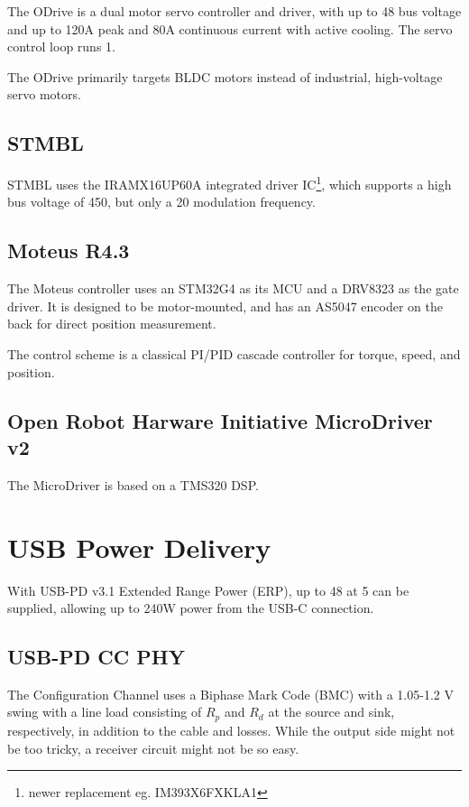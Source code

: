 \documentclass[12pt,a4paper,oneside,openany]{article}
\begin{document}
The ODrive is a dual motor servo controller and driver, with up to \unit{48}{\volt} bus voltage and up to \unit{120}{A} peak and \unit{80}{A} continuous current with active cooling. The servo control loop runs \unit{1}{\kilo\hertz}.

The ODrive primarily targets BLDC motors instead of industrial, high-voltage servo motors.

\subsection{STMBL}

STMBL uses the IRAMX16UP60A integrated driver IC\footnote{newer replacement eg. IM393X6FXKLA1}, which supports a high bus voltage of \unit{450}{\volt}, but only a \unit{20}{\kilo\hertz} modulation frequency.

\subsection{Moteus R4.3}

The Moteus controller uses an STM32G4 as its MCU and a DRV8323 as the gate driver. It is designed to be motor-mounted, and has an AS5047 encoder on the back for direct position measurement.

The control scheme is a classical PI/PID cascade controller for torque, speed, and position. 

\subsection{Open Robot Harware Initiative MicroDriver v2}

The MicroDriver is based on a TMS320 DSP.

\section {USB Power Delivery}

With USB-PD v3.1 Extended Range Power (ERP), up to \unit{48}{\volt} at \unit{5}{\ampere} can be supplied, allowing up to 240W power from the USB-C connection.

\subsection{USB-PD CC PHY} 

The Configuration Channel uses a Biphase Mark Code (BMC) with a 1.05-1.2 V swing with a line load consisting of $R_p$ and $R_d$ at the source and sink, respectively, in addition to the cable and losses. While the output side might not be too tricky, a receiver circuit might not be so easy.
\end{document}
